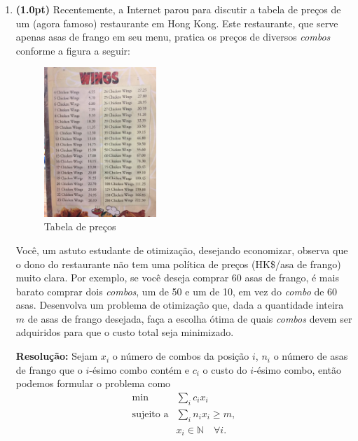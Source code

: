 \documentclass{article}
\begin{document}
\begin{enumerate}[label=$\blacktriangleright$ {\bf Questão \arabic*:},series=exerc,align=left]
\item {\bf (1.0pt)} Recentemente, a Internet parou para discutir a tabela de preços de um (agora famoso) restaurante em Hong Kong. Este restaurante, que serve apenas asas de frango em seu menu, pratica os preços de diversos {\em combos} conforme a figura a seguir:

\begin{figure}[h]
\centering
\includegraphics[width=0.4\textwidth]{wings.png}
\caption{Tabela de preços} \label{fig1}
\end{figure}

Você, um astuto estudante de otimização, desejando economizar, observa que o dono do restaurante não tem uma política de preços (HK\$/asa de frango) muito clara. Por exemplo, se você deseja comprar 60 asas de frango, é mais barato comprar dois {\em combos}, um de 50 e um de 10, em vez do {\em combo} de 60 asas. Desenvolva um problema de otimização que, dada a quantidade inteira $m$ de asas de frango desejada, faça a escolha ótima de quais {\em combos} devem ser adquiridos para que o custo total seja minimizado.

\begin{framed}
{\bf Resolução:}
Sejam $x_i$ o número de combos da posição $i$, $n_i$ o número de asas de frango que o $i$-ésimo combo contém e $c_i$ o custo do $i$-ésimo combo, então podemos formular o problema como
\[
\begin{array}{rl}
  \min & \sum_i c_i x_i \\
  \text{sujeito a} & \sum_i n_i x_i \ge m,\\
  & x_i \in \mathbb{N} \quad \forall i.
\end{array}
\]
\vspace{4cm}
\end{framed}


\end{enumerate}
\end{document}
